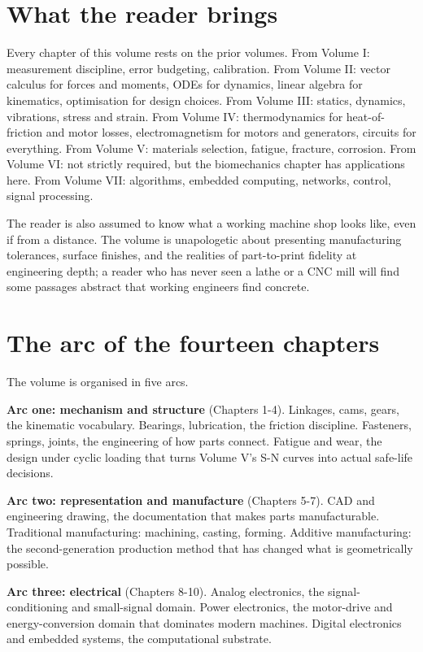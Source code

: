 \section*{What the reader brings}

Every chapter of this volume rests on the prior volumes. From Volume I: measurement discipline, error budgeting, calibration. From Volume II: vector calculus for forces and moments, ODEs for dynamics, linear algebra for kinematics, optimisation for design choices. From Volume III: statics, dynamics, vibrations, stress and strain. From Volume IV: thermodynamics for heat-of-friction and motor losses, electromagnetism for motors and generators, circuits for everything. From Volume V: materials selection, fatigue, fracture, corrosion. From Volume VI: not strictly required, but the biomechanics chapter has applications here. From Volume VII: algorithms, embedded computing, networks, control, signal processing.

The reader is also assumed to know what a working machine shop looks like, even if from a distance. The volume is unapologetic about presenting manufacturing tolerances, surface finishes, and the realities of part-to-print fidelity at engineering depth; a reader who has never seen a lathe or a CNC mill will find some passages abstract that working engineers find concrete.

\section*{The arc of the fourteen chapters}

The volume is organised in five arcs.

\textbf{Arc one: mechanism and structure} (Chapters 1-4). Linkages, cams, gears, the kinematic vocabulary. Bearings, lubrication, the friction discipline. Fasteners, springs, joints, the engineering of how parts connect. Fatigue and wear, the design under cyclic loading that turns Volume V's S-N curves into actual safe-life decisions.

\textbf{Arc two: representation and manufacture} (Chapters 5-7). CAD and engineering drawing, the documentation that makes parts manufacturable. Traditional manufacturing: machining, casting, forming. Additive manufacturing: the second-generation production method that has changed what is geometrically possible.

\textbf{Arc three: electrical} (Chapters 8-10). Analog electronics, the signal-conditioning and small-signal domain. Power electronics, the motor-drive and energy-conversion domain that dominates modern machines. Digital electronics and embedded systems, the computational substrate.

